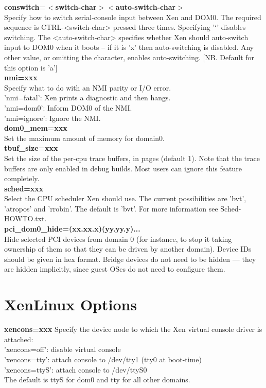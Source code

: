 \documentclass[11pt,twoside,final,openright]{xenstyle}
\begin{document}
{{\bf conswitch=$<$switch-char$><$auto-switch-char$>$ } \\
 Specify how to switch serial-console input between
 Xen and DOM0. The required sequence is CTRL-<switch-char>
 pressed three times. Specifying '`' disables switching.
 The <auto-switch-char> specifies whether Xen should
 auto-switch input to DOM0 when it boots -- if it is 'x'
 then auto-switching is disabled.  Any other value, or
 omitting the character, enables auto-switching.
 [NB. Default for this option is 'a'] \\

{\bf nmi=xxx } \\
 Specify what to do with an NMI parity or I/O error. \\
 'nmi=fatal':  Xen prints a diagnostic and then hangs. \\
 'nmi=dom0':   Inform DOM0 of the NMI. \\
 'nmi=ignore': Ignore the NMI. \\

{\bf dom0\_mem=xxx } \\
 Set the maximum amount of memory for domain0. \\

{\bf tbuf\_size=xxx } \\
 Set the size of the per-cpu trace buffers, in pages
 (default 1).  Note that the trace buffers are only
 enabled in debug builds.  Most users can ignore
 this feature completely. \\

{\bf sched=xxx } \\
 Select the CPU scheduler Xen should use.  The current
 possibilities are 'bvt', 'atropos' and 'rrobin'.  The
 default is 'bvt'.  For more information see
 Sched-HOWTO.txt. \\

{\bf pci\_dom0\_hide=(xx.xx.x)(yy.yy.y)... } \\
Hide selected PCI devices from domain 0 (for instance, to stop it
taking ownership of them so that they can be driven by another
domain).  Device IDs should be given in hex format.  Bridge devices do
not need to be hidden --- they are hidden implicitly, since guest OSes
do not need to configure them.

\section{XenLinux Options}

{\bf xencons=xxx}
Specify the device node to
which the Xen virtual console driver is attached: \\
 'xencons=off': disable virtual console \\
 'xencons=tty': attach console to /dev/tty1 (tty0 at boot-time) \\
 'xencons=ttyS': attach console to /dev/ttyS0\\
The default is ttyS for dom0 and tty for all other domains.

}
\end{document}
